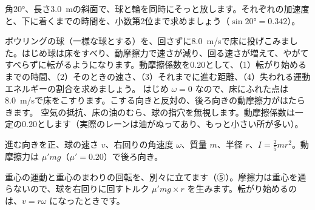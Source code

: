 \begin{jibun}
角\ang{20}、長さ\qty{3.0}{m}の斜面で、球と輪を同時にそっと放します。それぞれの加速度と、下に着くまでの時間を、小数第2位まで求めましょう（$\sin\ang{20}=0.342$）。
\end{jibun}

\begin{phreidai}\label{ph:力-7:ex3}
ボウリングの球（一様な球とする）を、回さずに\qty{8.0}{m/s}で床に投げこみました。はじめ球は床をすべり、動摩擦力で速さが減り、回る速さが増えて、やがてすべらずに転がるようになります。動摩擦係数を0.20として、（1）転がり始めるまでの時間、（2）そのときの速さ、（3）それまでに進む距離、（4）失われる運動エネルギーの割合を求めましょう。
\phbamen
はじめ $\omega=0$ なので、床にふれた点は\qty{8.0}{m/s}で床をこすります。こする向きと反対の、後ろ向きの動摩擦力がはたらきます。
\phmushi
空気の抵抗、床の油のむら、球の指穴を無視します。動摩擦係数は一定の0.20とします（実際のレーンは油がぬってあり、もっと小さい所が多い）。
\phzu
\noindent\begin{minipage}[c]{0.38\linewidth}\centering
{}
\end{minipage}\hfill
\begin{minipage}[c]{0.6\linewidth}
進む向きを正、球の速さ $v$、右回りの角速度 $\omega$、質量 $m$、半径 $r$、$I=\tfrac{2}{5}mr^2$。動摩擦力は $\mu'mg$（$\mu'=0.20$）で後ろ向き。
\end{minipage}
\phriyu
重心の運動と重心のまわりの回転を、別々に立てます（⑤）。摩擦力は重心を通らないので、球を右回りに回すトルク $\mu'mg\times r$ を生みます。転がり始めるのは、$v=r\omega$ になったときです。

\end{phreidai}
